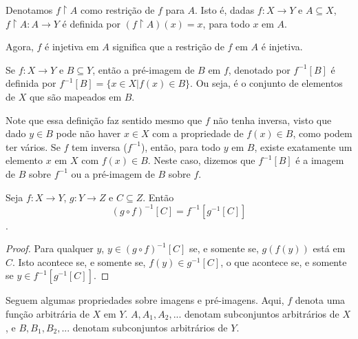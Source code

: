 \begin{definition}
    \label{def9}
    Denotamos $f \upharpoonright A$ como restrição de $f$ para $A$. Isto é, dadas $f: X \to Y$ 
    e $A \subseteq X$, $f \upharpoonright A : A \to Y$ é definida por $(f \upharpoonright A)(x) = x$, 
    para todo $x$ em $A$. 
\end{definition}

Agora, $f$ é injetiva em $A$ significa que a restrição de $f$ em $A$ é injetiva.

\begin{definition}
    \label{def10}
    Se $f: X \to Y$ e $B \subseteq Y$, então a pré-imagem de $B$ em $f$, denotado por $f^{-1}[B]$ é
    definida por $f^{-1}[B] = \{x \in X | f(x) \in B\}$. Ou seja, é o conjunto de elementos de $X$ que 
    são mapeados em $B$.
\end{definition}

Note que essa definição faz sentido mesmo que $f$ não tenha inversa, visto que dado $y \in B$ pode não 
haver $x \in X$ com a propriedade de $f(x) \in B$, como podem ter vários. Se $f$ tem inversa ($f^{-1}$), 
então, para todo $y$ em $B$, existe exatamente um elemento $x$ em $X$ com $f(x) \in B$. Neste caso, 
dizemos que $f^{-1}[B]$ é a imagem de $B$ sobre $f^{-1}$ ou a pré-imagem de $B$ sobre $f$. 

\begin{theorem}
    Seja $f: X \to Y$, $g: Y \to Z$ e $C \subseteq Z$. Então $$(g \circ f)^{-1}[C] = f^{-1}[g^{-1}[C]]$$.
\end{theorem}
\begin{proof}
    Para qualquer $y$, $y \in (g \circ f)^{-1}[C]$ se, e somente se, $g(f(y))$ está em $C$. 
    Isto acontece se, e somente se, $f(y) \in g^{-1}[C]$, o que acontece se, e somente se $y \in f^{-1}[g^{-1}[C]]$.
\end{proof}

Seguem algumas propriedades sobre imagens e pré-imagens. Aqui, $f$ denota uma função
arbitrária de $X$ em $Y$. $A, A_1, A_2, ...$ denotam subconjuntos arbitrários de $X$, 
e $B, B_1, B_2,...$ denotam subconjuntos arbitrários de $Y$.

